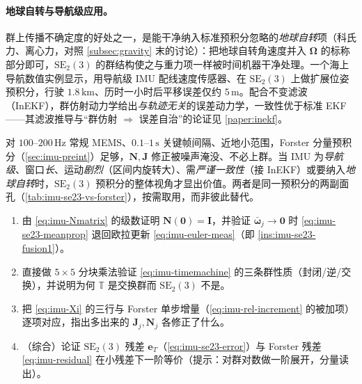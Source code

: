\paragraph{地球自转与导航级应用。}
群上传播不确定度的好处之一，是能干净纳入标准预积分忽略的\emph{地球自转}项（科氏力、离心力，对照 \cref{subsec:gravity} 末的讨论）：把地球自转角速度并入 $\boldsymbol\Omega$ 的标称部分即可，$\mathrm{SE}_2(3)$ 的群结构使之与重力项一样被时间机器干净处理。一个海上导航数值实例显示，用导航级 IMU 配线速度传感器、在 $\mathrm{SE}_2(3)$ 上做扩展位姿预积分，行驶 $1.8\,\mathrm{km}$、历时一小时后平移误差仅约 $5\,\mathrm m$\cite{carlone2026handbook}。配合不变滤波（InEKF），群仿射动力学给出\emph{与轨迹无关}的误差动力学，一致性优于标准 EKF——其滤波推导与“群仿射 $\Rightarrow$ 误差自治”的论证见 \cref{paper:inekf}。

\begin{insight}\label{ins:imu-se23-when}
对 $100$--$200\,\mathrm{Hz}$ 常规 MEMS、$0.1$--$1\,\mathrm s$ 关键帧间隔、近地小范围，Forster 分量预积分（\cref{sec:imu-preint}）足够，$\mathbf N,\mathbf J$ 修正被噪声淹没、不必上群。当 IMU 为\emph{导航级}、窗口\emph{长}、运动\emph{剧烈}（区间内旋转大）、需\emph{严谨一致性}（接 InEKF）或要纳入\emph{地球自转}时，$\mathrm{SE}_2(3)$ 预积分的整体视角才显出价值。两者是同一预积分的两副面孔（\cref{tab:imu-se23-vs-forster}），按需取用，而非彼此替代。
\end{insight}

\begin{practice}
\begin{enumerate}
  \item 由 \cref{eq:imu-Nmatrix} 的级数证明 $\mathbf N(\mathbf 0)=\mathbf I$，并验证 $\bar{\boldsymbol\omega}_j\to\mathbf 0$ 时 \cref{eq:imu-se23-meanprop} 退回欧拉更新 \cref{eq:imu-euler-meas}（即 \cref{ins:imu-se23-fusion1}）。
  \item 直接做 $5\times5$ 分块乘法验证 \cref{eq:imu-timemachine} 的三条群性质（封闭/逆/交换），并说明为何 $\mathbb T$ 是交换群而 $\mathrm{SE}_2(3)$ 不是。
  \item 把 \cref{eq:imu-Xi} 的三行与 Forster 单步增量（\cref{eq:imu-rel-increment} 的被加项）逐项对应，指出多出来的 $\mathbf J_j,\mathbf N_j$ 各修正了什么。
  \item （综合）论证 $\mathrm{SE}_2(3)$ 残差 $\mathbf e_T$（\cref{eq:imu-se23-error}）与 Forster 残差 \cref{eq:imu-residual} 在小残差下一阶等价（提示：对群对数做一阶展开，分量读出）。
\end{enumerate}
\end{practice}

